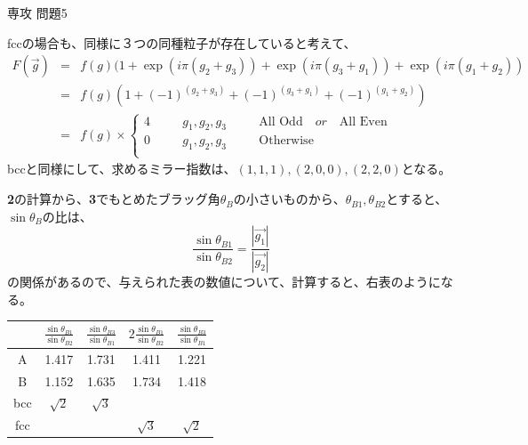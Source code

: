\documentclass[fleqn]{jbook}
\begin{document}
\begin{answer}{専攻 問題5}{}
\begin{subanswers}
fccの場合も、同様に３つの同種粒子が存在していると考えて、
\begin{eqnarray*}
F(\Vec{g}) & = & f(g)(1+\exp(i\pi(g_2+g_3))+\exp(i\pi(g_3+g_1))+\exp(i\pi(g_1+g_2)) \\
           & = & f(g)(1+(-1)^{(g_2+g_3)}+(-1)^{(g_3+g_1)}+(-1)^{(g_1+g_2)}) \\
           & = & f(g)\times\left\{
\begin{array}{cclcl} 
4 & \quad & g_1,g_2,g_3 & \quad & {\mbox{All Odd}} \quad or \quad   {\mbox{All Even}} \\
0 & \quad & g_1,g_2,g_3 & \quad & {\mbox{Otherwise}} \\
\end{array}\right.
\end{eqnarray*}
bccと同様にして、求めるミラー指数は、$(1,1,1),(2,0,0),(2,2,0)$となる。

\SubAnswer
\parbox[t]{70mm}{{\bf{2}}の計算から、{\bf{3}}でもとめたブラッグ角$\theta_B$の小さいものから、$\theta_{B1},\theta_{B2}$とすると、$\sin\theta_B$の比は、
\[ \frac{\sin\theta_{B1}}{\sin\theta_{B2}}=\frac{|\Vec{g_1}|}{|\Vec{g_2}|} \]
の関係があるので、与えられた表の数値について、計算すると、右表のようになる。}
\parbox[t]{80mm}{\vspace*{-5mm}
\begin{center}
\begin{tabular}{|c||c|c|c|c|} \hline
  & $\frac{\sin\theta_{B1}}{\sin\theta_{B2}}$ &  $\frac{\sin\theta_{B3}}{\sin\theta_{B1}}$ & $2\frac{\sin\theta_{B1}}{\sin\theta_{B2}}$ & $\frac{\sin\theta_{B3}}{\sin\theta_{B1}}$ \\ \hline\hline
A & 1.417 & 1.731 & 1.411 & 1.221 \\ \hline
B & 1.152 & 1.635 & 1.734 & 1.418 \\ \hline\hline
bcc & $\sqrt{2}$ & $\sqrt{3}$ & &  \\ \hline
fcc &      &    & $\sqrt{3}$ & $\sqrt{2}$ \\ \hline
\end{tabular}\end{center}
}


\end{subanswers}
\end{answer}
\end{document}

